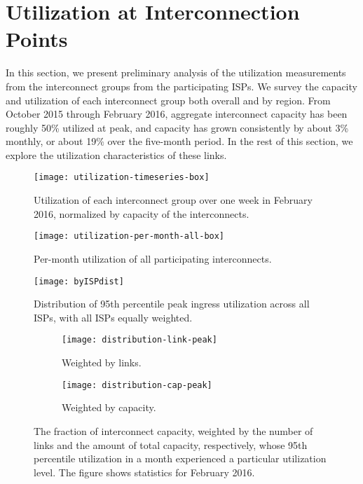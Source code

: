\section{Utilization at Interconnection Points}\label{sec:findings}

In this section, we present preliminary analysis of the utilization
measurements from the interconnect groups from the participating
ISPs. We survey the capacity and utilization of each interconnect group
both overall and by region. From October 2015 through February 2016, 
aggregate interconnect capacity has been roughly 50\% utilized at peak,
and capacity has grown consistently by about 3\% monthly, or about 19\% over the
five-month period.
In the rest of
this section, we explore the utilization characteristics of these links.

\begin{figure}[t]
\texttt{[image: utilization-timeseries-box]}
\caption{Utilization of each interconnect group over one week in
  February 2016, normalized by
  capacity of the interconnects.} 
\label{fig:utilization-timeseries}
\end{figure}


\begin{figure}[t]
\texttt{[image: utilization-per-month-all-box]}
\caption{Per-month utilization of all participating interconnects.} 
\label{fig:utilization-per-month-all}
\end{figure}



\begin{figure}[t]
\texttt{[image: byISPdist]}
\caption{Distribution of 95th percentile peak ingress utilization across
  all ISPs, with all ISPs equally weighted.} 
\label{fig:isp-dist}
\end{figure}


\begin{figure}[t!]
\begin{minipage}{1\linewidth}
\begin{subfigure}[b]{\linewidth}
\texttt{[image: distribution-link-peak]}
\caption{Weighted by links.\label{fig:dist-link-peak}}
\end{subfigure} \hfill
%
\begin{subfigure}[b]{\linewidth}
\texttt{[image: distribution-cap-peak]}
\caption{Weighted by capacity.\label{fig:dist-cap-peak}}
\end{subfigure}
\end{minipage}
\caption{The fraction of interconnect capacity, weighted by the number
  of links and the amount of total capacity, respectively, whose 95th
  percentile utilization in a month experienced a particular utilization
  level. The figure shows statistics for February 2016.}
\label{fig:dist-peak}
\end{figure}

